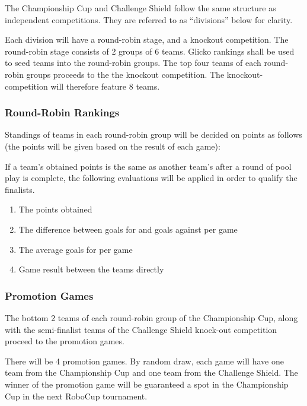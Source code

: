 The Championship Cup and Challenge Shield follow the same structure as independent competitions. They are referred to as ``divisions'' below for clarity.

Each division will have a round-robin stage, and a knockout competition. The round-robin stage consists of 2 groups of 6 teams. Glicko rankings shall be used to seed teams into the round-robin groups. The top four teams of each round-robin groups proceeds to the the knockout competition.  The knockout-competition will therefore feature 8 teams.

\subsubsection{Round-Robin Rankings}
\label{sec:round-robin-rankings}

Standings of teams in each round-robin group will be decided on points as follows (the points will be given based on the result of each game):


If a team's obtained points is the same as another team's after a round of pool play is complete, the following evaluations will be applied in order to qualify the finalists.
\begin{enumerate}

\item The points obtained

\item The difference between goals for and goals against per game

\item The average goals for per game

\item Game result between the teams directly

\end{enumerate}

\subsubsection{Promotion Games}

The bottom 2 teams of each round-robin group of the Championship Cup, along with the semi-finalist teams of the Challenge Shield knock-out competition proceed to the promotion games.

There will be 4 promotion games. By random draw, each game will have one team from the Championship Cup and one team from the Challenge Shield. The winner of the promotion game will be guaranteed a spot in the Championship Cup in the next RoboCup tournament.


